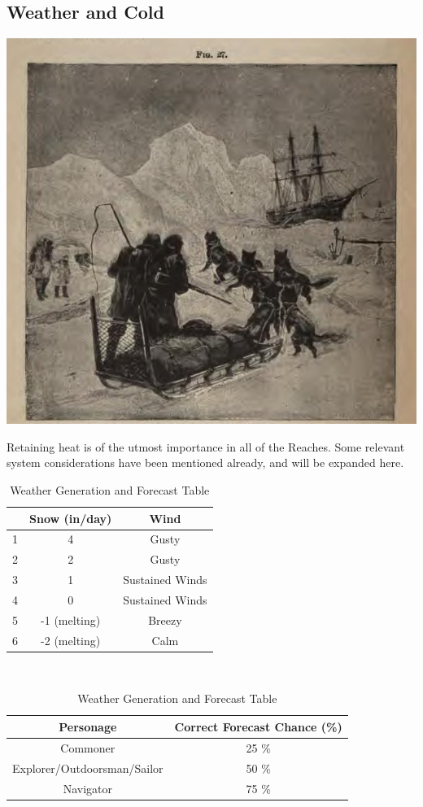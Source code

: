 \documentclass[notitlepage]{article}
\begin{document}
\begin{multicols}{2}
\subsection*{Weather and Cold}

{\centering \includegraphics[width=\columnwidth]{arctic-sledders}
}

Retaining heat is of the utmost importance in all of the Reaches.
Some relevant system considerations have been mentioned already, and will be expanded here. \\

\begin{table}[t]
  \centering \large
  \begin{tabular}{| c || c || c ||}
    \hline
    & Snow (in/day) & Wind \\ \hline
    1 & 4 & Gusty \\
    2 & 2 & Gusty \\
    3 & 1 & Sustained Winds \\
    4 & 0 & Sustained Winds \\
    5 & -1 (melting) & Breezy \\
    6 & -2 (melting)  & Calm \\ \hline
  \end{tabular} \\

  \begin{tabular}{|c||c|}
    \hline Personage & Correct Forecast Chance (\%) \\ \hline
    Commoner  & 25 \% \\
    Explorer/Outdoorsman/Sailor & 50 \% \\
    Navigator & 75 \% \\ \hline
  \end{tabular}
  \caption{Weather Generation and Forecast Table}
  \label{tbl:weather}  
\end{table}  



\end{multicols}
\end{document}
